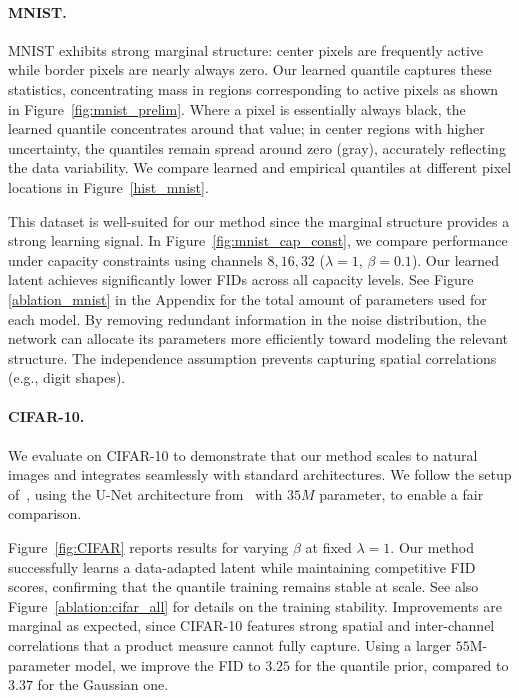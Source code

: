 \documentclass{article}
\theoremstyle{plain}
\theoremstyle{definition}
\theoremstyle{remark}
\begin{document}
\paragraph{MNIST.}

{MNIST} exhibits strong marginal structure: center pixels are frequently active while border pixels are nearly always zero. Our learned quantile captures these statistics, concentrating mass in regions corresponding to active pixels as shown in Figure~\ref{fig:mnist_prelim}. Where a pixel is essentially always black, the learned quantile concentrates around that value; in center regions with higher uncertainty, the quantiles remain spread around zero (gray), accurately reflecting the data variability. We compare learned and empirical quantiles at different pixel locations in Figure~\ref{hist_mnist}.
%


This dataset is well-suited for our method since the marginal structure provides a strong learning signal. In Figure~\ref{fig:mnist_cap_const}, we compare performance under capacity constraints using channels $8, 16, 32$ ($\lambda=1$, $\beta=0.1$). Our learned latent achieves significantly lower FIDs across all capacity levels. See Figure \ref{ablation_mnist} in the Appendix for the total amount of parameters used for each model. By removing redundant information in the noise distribution, the network can allocate its parameters more efficiently toward modeling the relevant structure. The independence assumption prevents capturing spatial correlations (e.g., digit shapes).


\paragraph{CIFAR-10.}
We evaluate on {CIFAR-10} to demonstrate that our method scales to natural images and integrates seamlessly with standard architectures. We follow the setup of~\cite{tong2024improvinggeneralizingflowbasedgenerative}, using the U-Net architecture from~\cite{nichol2021improved} with $35M$ parameter, to enable a fair comparison. 

Figure~\ref{fig:CIFAR} reports results for varying $\beta$ at fixed $\lambda=1$. Our method successfully learns a data-adapted latent while maintaining competitive FID scores, confirming that the quantile training remains stable at scale. See also Figure~\ref{ablation:cifar_all} for details on the training stability. Improvements are marginal as expected, since CIFAR-10 features strong spatial and inter-channel correlations that a product measure cannot fully capture. Using a larger $55$M-parameter model, we improve the FID to $\mathbf{3.25}$ for the quantile prior, compared to $3.37$ for the Gaussian one.
\end{document}
